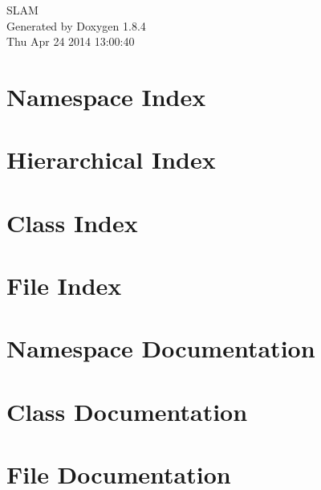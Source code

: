 \documentclass[twoside]{book}
\newcommand{\clearemptydoublepage}{%
  \newpage{\pagestyle{empty}\cleardoublepage}%
}
\begin{document}
\begin{titlepage}
\vspace*{7cm}
\begin{center}%
{\Large S\-L\-A\-M }\\
\vspace*{1cm}
{\large Generated by Doxygen 1.8.4}\\
\vspace*{0.5cm}
{\small Thu Apr 24 2014 13:00:40}\\
\end{center}
\end{titlepage}
\clearemptydoublepage
\tableofcontents
\clearemptydoublepage
{}

\chapter{Namespace Index}

\chapter{Hierarchical Index}

\chapter{Class Index}

\chapter{File Index}

\chapter{Namespace Documentation}

\chapter{Class Documentation}












\chapter{File Documentation}















\newpage
{}
{}
\printindex
\end{document}
